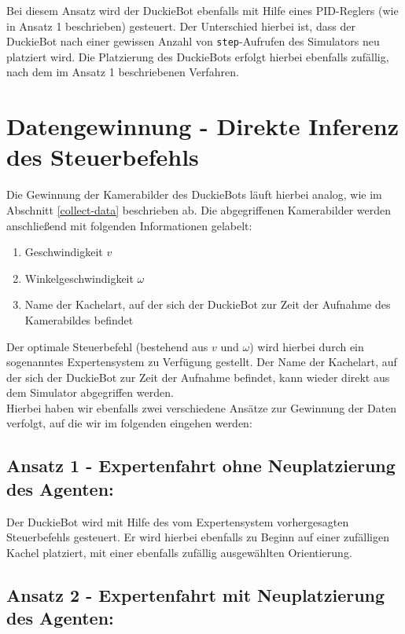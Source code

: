 Bei diesem Ansatz wird der DuckieBot ebenfalls mit Hilfe eines PID-Reglers (wie in Ansatz 1 beschrieben) gesteuert. Der Unterschied hierbei ist, dass der DuckieBot nach einer gewissen Anzahl von \texttt{step}-Aufrufen des Simulators neu platziert wird. Die Platzierung des DuckieBots erfolgt hierbei ebenfalls zufällig, nach dem im Ansatz 1 beschriebenen Verfahren.

\section{Datengewinnung - Direkte Inferenz des Steuerbefehls}

Die Gewinnung der Kamerabilder des DuckieBots läuft hierbei analog, wie im Abschnitt \ref{collect-data} beschrieben ab. Die abgegriffenen Kamerabilder werden anschließend mit folgenden Informationen gelabelt:

\begin{enumerate}
	\item Geschwindigkeit $v$
	\item Winkelgeschwindigkeit $\omega$
	\item Name der Kachelart, auf der sich der DuckieBot zur Zeit der Aufnahme des Kamerabildes befindet
\end{enumerate}


Der optimale Steuerbefehl (bestehend aus $v$ und $\omega$) wird hierbei durch ein sogenanntes Expertensystem zu Verfügung gestellt. Der Name der Kachelart, auf der sich der DuckieBot zur Zeit der Aufnahme befindet, kann wieder direkt aus dem Simulator abgegriffen werden. \\

Hierbei haben wir ebenfalls zwei verschiedene Ansätze zur Gewinnung der Daten verfolgt, auf die wir im folgenden eingehen werden:

\subsection{Ansatz 1 - Expertenfahrt ohne Neuplatzierung des Agenten:}

Der DuckieBot wird mit Hilfe des vom Expertensystem vorhergesagten Steuerbefehls gesteuert. Er wird hierbei ebenfalls zu Beginn auf einer zufälligen Kachel platziert, mit einer ebenfalls zufällig ausgewählten Orientierung.

\subsection{Ansatz 2 - Expertenfahrt mit Neuplatzierung des Agenten:}

